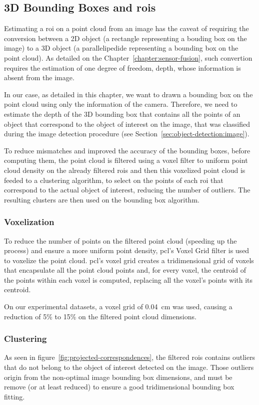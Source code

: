 \subsection{3D Bounding Boxes and \aclp{roi}}
\label{subsec:object-detection:bounding-boxes-and-roi}
Estimating a \ac{roi} on a point cloud from an image has the caveat of requiring the conversion between a 2D object (a rectangle representing a bouding box on the image) to a 3D object (a parallelipedide representing a bounding box on the point cloud). As detailed on the Chapter~\ref{chapter:sensor-fusion}, such convertion requires the estimation of one degree of freedom, depth, whose information is absent from the image.

In our case, as detailed in this chapter, we want to drawn a bounding box on the point cloud using only the information of the camera. Therefore, we need to estimate the depth of the 3D bounding box that contains all the points of an object that correspond to the object of interest on the image, that was classified during the image detection procedure (see Section~\ref{sec:object-detection:image}).

To reduce mismatches and improved the accuracy of the bounding boxes, before computing them, the point cloud is filtered using a voxel filter to uniform point cloud density on the already filtered \acp{roi} and then this voxelized point cloud is feeded to a clustering algorithm, to select on the points of each \ac{roi} that correspond to the actual object of interest, reducing the number of outliers. The resulting clusters are then used on the bounding box algorithm.


\subsubsection{Voxelization}
To reduce the number of points on the filtered point cloud (speeding up the process) and ensure a more uniform point density, \ac{pcl}'s Voxel Grid filter is used to voxelize the point cloud. \ac{pcl}'s voxel grid creates a tridimensional grid of voxels that encapsulate all the point cloud points and, for every voxel, the centroid of the points within each voxel is computed, replacing all the voxel's points with its centroid.

On our experimental datasets, a voxel grid of \SI{0.04}{\centi\meter} was used, causing a reduction of 5\% to 15\% on the filtered point cloud dimensions.

\subsubsection{Clustering}
As seen in figure~\ref{fig:projected-correspondences}, the filtered \acp{roi} contains outliers that do not belong to the object of interest detected on the image. Those outliers origin from the non-optimal image bounding box dimensions, and must be remove (or at least reduced) to ensure a good tridimensional bounding box fitting.

